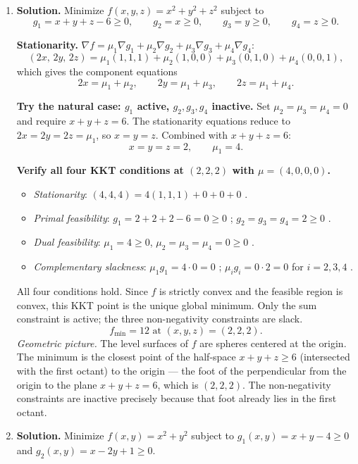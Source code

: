 \begin{enumerate}
\item \textbf{Solution.}
Minimize $f(x,y,z) = x^2 + y^2 + z^2$ subject to
\[
g_1 = x + y + z - 6 \geq 0, \qquad g_2 = x \geq 0, \qquad g_3 = y \geq 0, \qquad g_4 = z \geq 0.
\]

\textbf{Stationarity.} $\nabla f = \mu_1 \nabla g_1 + \mu_2 \nabla g_2 + \mu_3 \nabla g_3 + \mu_4 \nabla g_4$:
\[
(2x,\, 2y,\, 2z) = \mu_1(1,1,1) + \mu_2(1,0,0) + \mu_3(0,1,0) + \mu_4(0,0,1),
\]
which gives the component equations
\[
2x = \mu_1 + \mu_2, \qquad 2y = \mu_1 + \mu_3, \qquad 2z = \mu_1 + \mu_4.
\]

\textbf{Try the natural case: $g_1$ active, $g_2, g_3, g_4$ inactive.} Set $\mu_2 = \mu_3 = \mu_4 = 0$ and require $x + y + z = 6$. The stationarity equations reduce to $2x = 2y = 2z = \mu_1$, so $x = y = z$. Combined with $x+y+z = 6$:
\[
x = y = z = 2, \qquad \mu_1 = 4.
\]

\textbf{Verify all four KKT conditions at $(2,2,2)$ with $\mu = (4,0,0,0)$.}
\begin{itemize}
\item \emph{Stationarity}: $(4,4,4) = 4(1,1,1) + 0 + 0 + 0$ \checkmark.
\item \emph{Primal feasibility}: $g_1 = 2+2+2-6 = 0 \geq 0$ \checkmark; $g_2 = g_3 = g_4 = 2 \geq 0$ \checkmark.
\item \emph{Dual feasibility}: $\mu_1 = 4 \geq 0$, $\mu_2 = \mu_3 = \mu_4 = 0 \geq 0$ \checkmark.
\item \emph{Complementary slackness}: $\mu_1 g_1 = 4 \cdot 0 = 0$ \checkmark; $\mu_i g_i = 0 \cdot 2 = 0$ for $i = 2,3,4$ \checkmark.
\end{itemize}

All four conditions hold. Since $f$ is strictly convex and the feasible region is convex, this KKT point is the unique global minimum. Only the sum constraint is active; the three non-negativity constraints are slack.
\[
\boxed{f_{\min} = 12 \text{ at } (x,y,z) = (2,2,2).}
\]
\textit{Geometric picture.} The level surfaces of $f$ are spheres centered at the origin. The minimum is the closest point of the half-space $x+y+z \geq 6$ (intersected with the first octant) to the origin --- the foot of the perpendicular from the origin to the plane $x+y+z = 6$, which is $(2,2,2)$. The non-negativity constraints are inactive precisely because that foot already lies in the first octant.

\item \textbf{Solution.}
Minimize $f(x,y) = x^2 + y^2$ subject to $g_1(x,y) = x + y - 4 \geq 0$ and $g_2(x,y) = x - 2y + 1 \geq 0$.


\end{enumerate}

